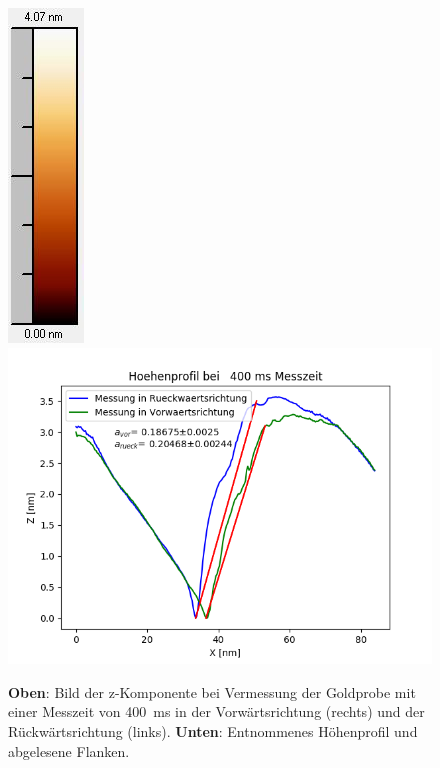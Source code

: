 \documentclass[12pt,a4paper]{article}
\begin{document}
\begin{figure}
\includegraphics[scale=0.6]{Bilder/Anhang/Zeit/0_4_Zeit_nach_Skala.jpg}
\includegraphics[scale=0.6]{Bilder/Anhang/Zeit/Profil_Zeit_400.png}
\caption{\textbf{Oben}: Bild der z-Komponente bei Vermessung der Goldprobe mit einer Messzeit von \SI{400}{ms} in der Vorwärtsrichtung (rechts) und der Rückwärtsrichtung (links). \textbf{Unten}: Entnommenes Höhenprofil und abgelesene Flanken.}
\end{figure}
\end{document}
